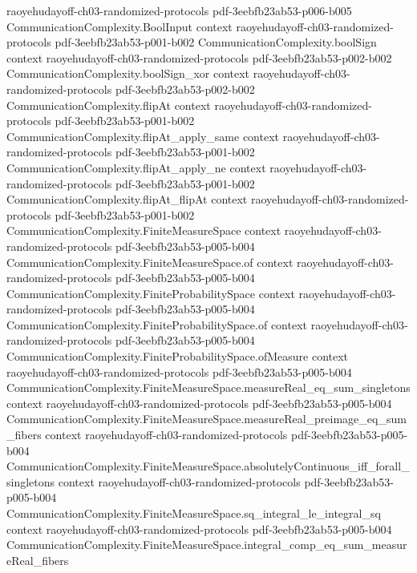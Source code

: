 \begin{theorem}
  {raoyehudayoff-ch03-randomized-protocols}
  {pdf-3eebfb23ab53-p006-b005}
\proofstep
  {CommunicationComplexity.BoolInput}
  {context}
  {raoyehudayoff-ch03-randomized-protocols}
  {pdf-3eebfb23ab53-p001-b002}
\proofstep
  {CommunicationComplexity.boolSign}
  {context}
  {raoyehudayoff-ch03-randomized-protocols}
  {pdf-3eebfb23ab53-p002-b002}
\proofstep
  {CommunicationComplexity.boolSign_xor}
  {context}
  {raoyehudayoff-ch03-randomized-protocols}
  {pdf-3eebfb23ab53-p002-b002}
\proofstep
  {CommunicationComplexity.flipAt}
  {context}
  {raoyehudayoff-ch03-randomized-protocols}
  {pdf-3eebfb23ab53-p001-b002}
\proofstep
  {CommunicationComplexity.flipAt_apply_same}
  {context}
  {raoyehudayoff-ch03-randomized-protocols}
  {pdf-3eebfb23ab53-p001-b002}
\proofstep
  {CommunicationComplexity.flipAt_apply_ne}
  {context}
  {raoyehudayoff-ch03-randomized-protocols}
  {pdf-3eebfb23ab53-p001-b002}
\proofstep
  {CommunicationComplexity.flipAt_flipAt}
  {context}
  {raoyehudayoff-ch03-randomized-protocols}
  {pdf-3eebfb23ab53-p001-b002}
\proofstep
  {CommunicationComplexity.FiniteMeasureSpace}
  {context}
  {raoyehudayoff-ch03-randomized-protocols}
  {pdf-3eebfb23ab53-p005-b004}
\proofstep
  {CommunicationComplexity.FiniteMeasureSpace.of}
  {context}
  {raoyehudayoff-ch03-randomized-protocols}
  {pdf-3eebfb23ab53-p005-b004}
\proofstep
  {CommunicationComplexity.FiniteProbabilitySpace}
  {context}
  {raoyehudayoff-ch03-randomized-protocols}
  {pdf-3eebfb23ab53-p005-b004}
\proofstep
  {CommunicationComplexity.FiniteProbabilitySpace.of}
  {context}
  {raoyehudayoff-ch03-randomized-protocols}
  {pdf-3eebfb23ab53-p005-b004}
\proofstep
  {CommunicationComplexity.FiniteProbabilitySpace.ofMeasure}
  {context}
  {raoyehudayoff-ch03-randomized-protocols}
  {pdf-3eebfb23ab53-p005-b004}
\proofstep
  {CommunicationComplexity.FiniteMeasureSpace.measureReal_eq_sum_singletons}
  {context}
  {raoyehudayoff-ch03-randomized-protocols}
  {pdf-3eebfb23ab53-p005-b004}
\proofstep
  {CommunicationComplexity.FiniteMeasureSpace.measureReal_preimage_eq_sum_fibers}
  {context}
  {raoyehudayoff-ch03-randomized-protocols}
  {pdf-3eebfb23ab53-p005-b004}
\proofstep
  {CommunicationComplexity.FiniteMeasureSpace.absolutelyContinuous_iff_forall_singletons}
  {context}
  {raoyehudayoff-ch03-randomized-protocols}
  {pdf-3eebfb23ab53-p005-b004}
\proofstep
  {CommunicationComplexity.FiniteMeasureSpace.sq_integral_le_integral_sq}
  {context}
  {raoyehudayoff-ch03-randomized-protocols}
  {pdf-3eebfb23ab53-p005-b004}
\proofstep
  {CommunicationComplexity.FiniteMeasureSpace.integral_comp_eq_sum_measureReal_fibers}

\end{theorem}
